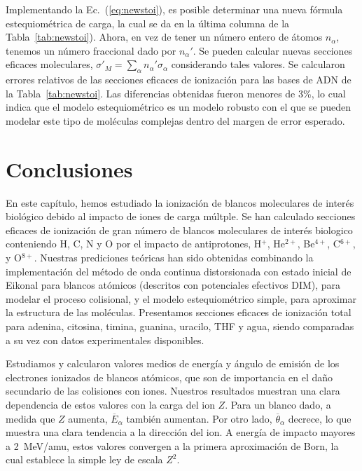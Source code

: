 Implementando la Ec.~(\ref{eq:newstoi}), es posible determinar una nueva 
fórmula estequiométrica de carga, la cual se da en la última columna de 
la Tabla~\ref{tab:newstoi}). Ahora, en vez de tener un número entero de 
átomos $n_{\alpha}$, tenemos un número fraccional dado por $n_{\alpha}'$. 
Se pueden calcular nuevas secciones eficaces moleculares, 
$\sigma'_{M}=\sum_{\alpha}n_{\alpha}'\sigma_{\alpha}$ considerando tales 
valores. Se calcularon errores relativos de las secciones eficaces de 
ionización para las bases de ADN de la Tabla~\ref{tab:newstoi}. Las 
diferencias obtenidas fueron menores de 3\%, lo cual indica que el modelo 
estequiométrico es un modelo robusto con el que se pueden modelar este 
tipo de moléculas complejas dentro del margen de error esperado.

\section{Conclusiones}

En este capítulo, hemos estudiado la ionización de blancos moleculares 
de interés biológico debido al impacto de iones de carga múltple. Se han
calculado secciones eficaces de ionización de gran número de blancos 
moleculares de interés biologico conteniendo H, C, N y O por el impacto 
de antiprotones, H$^{+}$, He$^{2+}$, Be$^{4+}$, C$^{6+}$, y O$^{8+}$. 
Nuestras prediciones teóricas han sido obtenidas combinando la 
implementación del método de onda continua distorsionada con estado 
inicial de Eikonal para blancos atómicos (descritos con potenciales 
efectivos DIM), para modelar el proceso colisional, y el modelo 
estequiométrico simple, para aproximar la estructura de las moléculas. 
Presentamos secciones eficaces de ionización total para adenina, 
citosina, timina, guanina, uracilo, THF y agua, siendo comparadas a su 
vez con datos experimentales disponibles. 

Estudiamos y calcularon valores medios de energía y ángulo de emisión de 
los electrones ionizados de blancos atómicos, que son de importancia en 
el daño secundario de las colisiones con iones. Nuestros resultados 
muestran una clara dependencia de estos valores con la carga del ion $Z$. 
Para un blanco dado, a medida que $Z$ aumenta, $\overline{E}_{\alpha}$ 
también aumentan. Por otro lado, $\overline{\theta}_{\alpha}$ decrece, lo 
que muestra una clara tendencia a la dirección del ion. A energía de 
impacto mayores a 2~MeV/amu, estos valores convergen a la primera 
aproximación de Born, la cual establece la simple ley de escala $Z^{2}$. 

